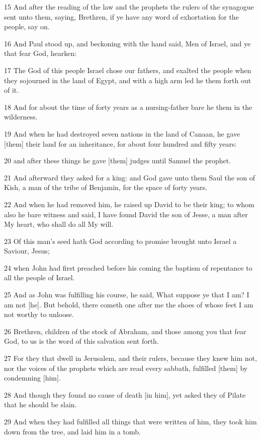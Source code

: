 \par 15 And after the reading of the law and the prophets the rulers of the synagogue sent unto them, saying, Brethren, if ye have any word of exhortation for the people, say on.
\par 16 And Paul stood up, and beckoning with the hand said, Men of Israel, and ye that fear God, hearken:
\par 17 The God of this people Israel chose our fathers, and exalted the people when they sojourned in the land of Egypt, and with a high arm led he them forth out of it.
\par 18 And for about the time of forty years as a nursing-father bare he them in the wilderness.
\par 19 And when he had destroyed seven nations in the land of Canaan, he gave [them] their land for an inheritance, for about four hundred and fifty years:
\par 20 and after these things he gave [them] judges until Samuel the prophet.
\par 21 And afterward they asked for a king: and God gave unto them Saul the son of Kish, a man of the tribe of Benjamin, for the space of forty years.
\par 22 And when he had removed him, he raised up David to be their king; to whom also he bare witness and said, I have found David the son of Jesse, a man after My heart, who shall do all My will.
\par 23 Of this man's seed hath God according to promise brought unto Israel a Saviour, Jesus;
\par 24 when John had first preached before his coming the baptism of repentance to all the people of Israel.
\par 25 And as John was fulfilling his course, he said, What suppose ye that I am? I am not [he]. But behold, there cometh one after me the shoes of whose feet I am not worthy to unloose.
\par 26 Brethren, children of the stock of Abraham, and those among you that fear God, to us is the word of this salvation sent forth.
\par 27 For they that dwell in Jerusalem, and their rulers, because they knew him not, nor the voices of the prophets which are read every sabbath, fulfilled [them] by condemning [him].
\par 28 And though they found no cause of death [in him], yet asked they of Pilate that he should be slain.
\par 29 And when they had fulfilled all things that were written of him, they took him down from the tree, and laid him in a tomb.
